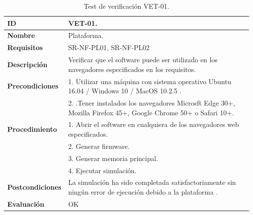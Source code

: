 \begin{center}
\begin{table}[htb]
\centering
\begin{tabular}{@{}p{2.5cm} p{13cm}@{}} 
\toprule
\textbf{ID} 					& VET-01. \\
\midrule
\textbf{Nombre} 				& Plataforma. \\
\midrule
\textbf{Requisitos} 		& SR-NF-PL01, SR-NF-PL02\\
\midrule
\textbf{Descripción} 		& Verificar que el software puede ser utilizado en los navegadores especificados en los requisitos. \\
\midrule
\textbf{Precondiciones}		& 1. Utilizar una máquina con sistema operativo Ubuntu 16.04 / Windows 10 / MacOS 10.2.5 .\\
							& 2. .Tener instalados los navegadores Microsft Edge 30+, Mozilla Firefox 45+, Google Chrome 50+ o Safari 10+. \\
\midrule
\textbf{Procedimiento}			& 1. Abrir el software en cualquiera de los navegadores web especificados. \\
							& 2. Generar firmware.\\
							& 3. Generar memoria principal.\\
							& 4. Ejecutar simulación.\\
\midrule
\textbf{Postcondiciones} 		&  La simulación ha sido completada satisfactoriamente sin ningún error de ejecución debido a la plataforma .\\
\midrule
\textbf{Evaluación} 			& OK \\
\bottomrule
\end{tabular}
\caption{Test de verificación VET-01.}
\label{tab:vet01}
\end{table}
\end{center}

